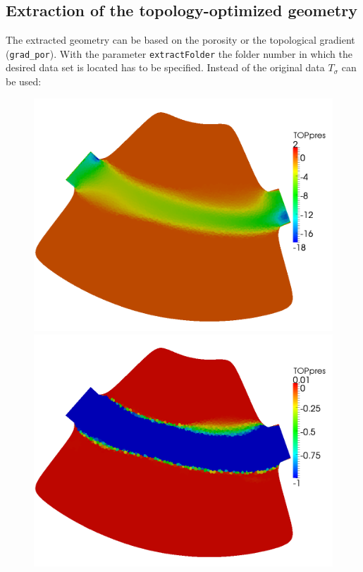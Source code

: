 \documentclass[oneside]{article}
\numberwithin{equation}{section}
\numberwithin{figure}{section}
\numberwithin{figure}{section}
\begin{document}
\subsection{Extraction of the topology-optimized geometry}
The extracted geometry can be based on the porosity or the topological gradient (\verb|grad_por|). With the parameter \texttt{extractFolder} the folder number in which the desired data set is located has to be specified. Instead of the original data $T_\sigma$ can be used:
\begin{figure}[htbp]
    \centering
    \includegraphics[scale=0.1]{TS2e5top2.png}
    \includegraphics[scale=0.1]{TS2e5top.png}

\end{figure}
\end{document}
